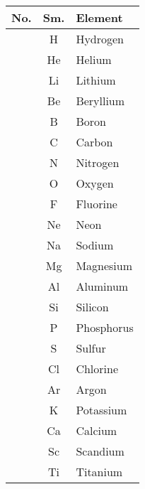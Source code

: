 \documentclass{article}
\begin{document}
\setcounter{rownum}{0} %
\newcommand{\Rownum}{\stepcounter{rownum}\arabic{rownum}} %


\begin{table}[h!]
	\begin{minipage}{0.33\textwidth}
		\centering
		\begin{tabular}{>{\Rownum}ccl}
			\toprule
			\textbf{No.} & \textbf{Sm.} & \textbf{Element} \\
			\midrule
			             & H            & Hydrogen         \\
			             & He           & Helium           \\
			             & Li           & Lithium          \\
			             & Be           & Beryllium        \\
			             & B            & Boron            \\
			             & C            & Carbon           \\
			             & N            & Nitrogen         \\
			             & O            & Oxygen           \\
			             & F            & Fluorine         \\
			             & Ne           & Neon             \\
			             & Na           & Sodium           \\
			             & Mg           & Magnesium        \\
			             & Al           & Aluminum         \\
			             & Si           & Silicon          \\
			             & P            & Phosphorus       \\
			             & S            & Sulfur           \\
			             & Cl           & Chlorine         \\
			             & Ar           & Argon            \\
			             & K            & Potassium        \\
			             & Ca           & Calcium          \\
			             & Sc           & Scandium         \\
			             & Ti           & Titanium         \\

\end{tabular}
\end{minipage}
\end{table}
\end{document}
